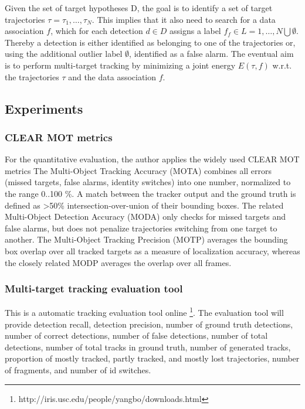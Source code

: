 \documentclass{article}
\begin{document}
Given the set of target hypotheses D, the goal is to identify a set of target trajectories $\tau = {\tau_1,\ldots,\tau_N}$. This implies that it also need to search for a data association $f$, which for each detection $d \in D$ assigns a label $f_f \in L = {1,\ldots,N}\bigcup \emptyset$. Thereby a detection is either identified as belonging to one of the trajectories or, using the additional outlier label $\emptyset$, identified as a false alarm.
The eventual aim is to perform multi-target tracking by minimizing a joint energy $E(\tau , f)$ w.r.t. the trajectories $\tau$ and the data association $f$. 

\subsection{Experiments}

\subsubsection{CLEAR MOT metrics}
For the quantitative evaluation, the author applies the widely used CLEAR MOT metrics The Multi-Object Tracking Accuracy (MOTA) combines all errors (missed targets, false alarms, identity switches) into one number, normalized to the range 0..100 \%. A match between the tracker output and the ground truth is defined as >50\% intersection-over-union of their bounding boxes. The related Multi-Object Detection Accuracy (MODA) only checks for missed targets and false alarms, but does not penalize trajectories switching from one target to another. The Multi-Object Tracking Precision (MOTP) averages the bounding box overlap over all tracked targets as a measure of localization accuracy, whereas the closely related MODP averages the overlap over all frames.

\subsubsection{Multi-target tracking evaluation tool}
This is a automatic tracking evaluation tool online \footnote{http://iris.usc.edu/people/yangbo/downloads.html}. The evaluation tool will provide detection recall, detection precision, number of ground truth detections, number of correct detections, number of false detections, number of total detections, number of total tracks in ground truth, number of generated tracks, proportion of mostly tracked, partly tracked, and mostly lost trajectories, number of fragments, and number of id switches.
\end{document}
